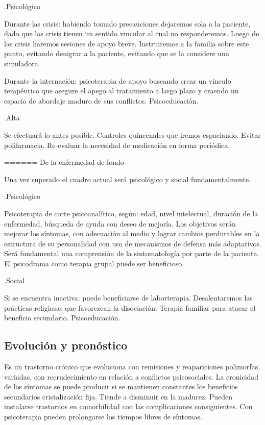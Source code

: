 \documentclass{scrbook}
\begin{document}
.Psicológico

Durante las crisis: habiendo tomado precauciones dejaremos sola a la paciente, dado que las crisis tienen un sentido vincular al cual no responderemos. Luego de las crisis haremos sesiones de apoyo breve. Instruiremos a la familia sobre este punto, evitando denigrar a la paciente, evitando que se la considere una simuladora. 

Durante la internación: psicoterapia de apoyo buscando crear un vínculo terapéutico que asegure el apego al tratamiento a largo plazo y craendo un espacio de abordaje maduro de sus conflictos. Psicoeducación.

.Alta

Se efectuará lo antes posible. Controles quincenales que iremos espaciando. Evitar polifarmacia. Re-evaluar la necesidad de medicación en forma periódica.

====== De la enfermedad de fondo

Una vez superado el cuadro actual será psicológico y social fundamentalmente.

.Psicológico

Psicoterapia de corte psicoanalítico, según: edad, nivel intelectual, duración de la enfermedad, búsqueda de ayuda con deseo de mejoría. Los objetivos serán mejorar los síntomas, con adecuación al medio y lograr cambios perdurables en la estructura de su personalidad con uso de mecanismos de defensa más adaptativos. Será fundamental una comprensión de la sintomatología por parte de la paciente. El psicodrama como terapia grupal puede ser beneficioso.

.Social

Si se encuentra inactiva: puede beneficiarse de laborterapia. Desalentaremos las prácticas religiosas que favorezcan la disociación. Terapia familiar para atacar el beneficio secundario. Psicoeducación.
\subsection*{Evolución y pronóstico}

Es un trastorno crónico que evoluciona con remisiones y reapariciones polimorfas, variadas, con recrudecimiento en relación a conflictos psicosociales. La cronicidad de los síntomas se puede producir si se mantienen constantes los beneficios secundarios cristalización fija. Tiende a disminuir en la madurez. Pueden instalarse trastornos en comorbilidad con las complicaciones consiguientes.
Con psicoterapia pueden prolongarse los tiempos libres de síntomas. 
\end{document}
